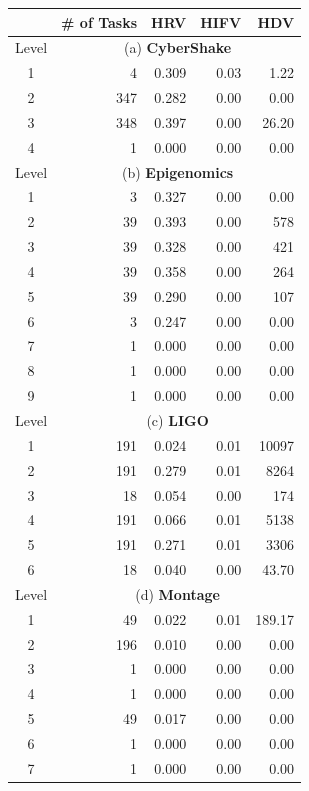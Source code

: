 \begin{table}[!htb]
	\setlength{\tabcolsep}{12pt}
	\centering
	\small
	\begin{tabular}{c|r|r|r|r}
		& \# of Tasks & HRV &  HIFV & HDV  \\ \hline
		Level & \multicolumn{4}{c}{(a) \textbf{CyberShake}} \\
		\hline
		1 & 4 & 0.309 & 0.03 & 1.22 \\
		2 & 347 & 0.282 & 0.00 & 0.00 \\
		3 & 348 & 0.397 & 0.00 & 26.20 \\
		4 & 1 & 0.000 & 0.00 & 0.00 \\
		\hline
		Level & \multicolumn{4}{c}{(b) \textbf{Epigenomics}} \\
		\hline
		1 & 3 & 0.327 & 0.00 & 0.00  \\
		2 & 39 & 0.393 & 0.00 & 578 \\
		3 & 39 & 0.328 & 0.00 & 421 \\
		4 & 39 & 0.358 & 0.00 & 264 \\
		5 &39 & 0.290 & 0.00 & 107 \\
		6 & 3 & 0.247 & 0.00 & 0.00  \\
		7 &1  & 0.000 & 0.00 & 0.00 \\
		8 &1 & 0.000 & 0.00 & 0.00 \\
		9 & 1 & 0.000 & 0.00 & 0.00 \\
		\hline
		Level & \multicolumn{4}{c}{(c) \textbf{LIGO}} \\
		\hline
		1 & 191 & 0.024 & 0.01 & 10097 \\
		2 & 191 & 0.279 & 0.01 & 8264 \\
		3 & 18 & 0.054 & 0.00 & 174 \\
		4 & 191 & 0.066 & 0.01 & 5138 \\
		5 & 191 & 0.271 & 0.01 & 3306 \\
		6 & 18 &  0.040 & 0.00 & 43.70 \\
		\hline		
		Level & \multicolumn{4}{c}{(d) \textbf{Montage}} \\
		\hline
		1 &49 & 0.022 & 0.01 & 189.17 \\
		2 & 196 & 0.010 & 0.00 & 0.00 \\
		3 & 1 & 0.000 & 0.00 & 0.00 \\
		4 & 1 & 0.000 & 0.00 & 0.00 \\
		5 &49 & 0.017 & 0.00 & 0.00 \\
		6 & 1 & 0.000 & 0.00 & 0.00 \\
		7 &1  & 0.000 & 0.00 & 0.00 \\

\end{tabular}
\end{table}
